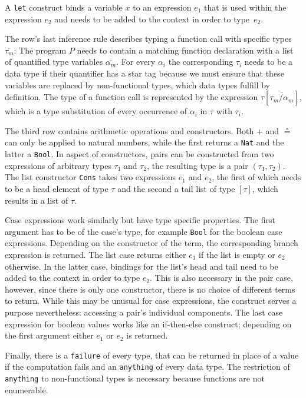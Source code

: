 \documentclass[fleqn, abstract=on]{scrreprt}
\begin{document}
A \texttt{let} construct binds a variable $x$ to an expression $e_{1}$ that is used within the expression $e_{2}$ and needs to be added to the context in order to \mbox{type $e_{2}$}.
\par
The row's last inference rule describes typing a function call with specific types $\overline{\tau_{m}}$: The program $P$ needs to contain a matching function declaration with a list of quantified type variables $\overline{\alpha_{m}}$. For every $\alpha_{i}$ the corresponding $\tau_{i}$ needs to be a data type if their quantifier has a star tag because we must ensure that these variables are replaced by non-functional types, which data types fulfill by definition. The type of a function call is represented by the expression $\tau [\overline{\tau_{m}/\alpha_{m}}]$, which is a type substitution of every occurrence of $\alpha_{i}$ in $\tau$ with $\tau_{i}$.
\par
The third row contains arithmetic operations and constructors. Both $+$ and $\circeq$ can only be applied to natural numbers, while the first returns a \texttt{Nat} and the latter a \texttt{Bool}. In aspect of constructors, pairs can be constructed from two expressions of arbitrary types $\tau_{1}$ and $\tau_{2}$, the resulting type is a pair $(\tau_{1}, \tau_{2})$. The list constructor \texttt{Cons} takes two expressions $e_{1}$ and $e_{2}$, the first of which needs to be a head element of type $\tau$ and the second a tail list of type $[\tau]$, which results in a list of $\tau$.
\par
Case expressions work similarly but have type specific properties. The first argument has to be of the case's type, for example \texttt{Bool} for the boolean case expressions. Depending on the constructor of the term, the corresponding branch expression is returned. The list case returns either $e_{1}$ if the list is empty or $e_{2}$ otherwise. In the latter case, bindings for the list's head and tail need to be added to the context in order to type $e_{2}$. This is also necessary in the pair case, however, since there is only one constructor, there is no choice of different terms to return. While this may be unusual for case expressions, the construct serves a purpose nevertheless: accessing a pair's individual components. The last case expression for boolean values works like an if-then-else construct; depending on the first argument either $e_{1}$ or $e_{2}$ is returned.
\par
Finally, there is a \texttt{failure} of every type, that can be returned in place of a value if the computation fails and an \texttt{anything} of every data type. The restriction of \texttt{anything} to non-functional types is necessary because functions are not enumerable.\\
\end{document}
